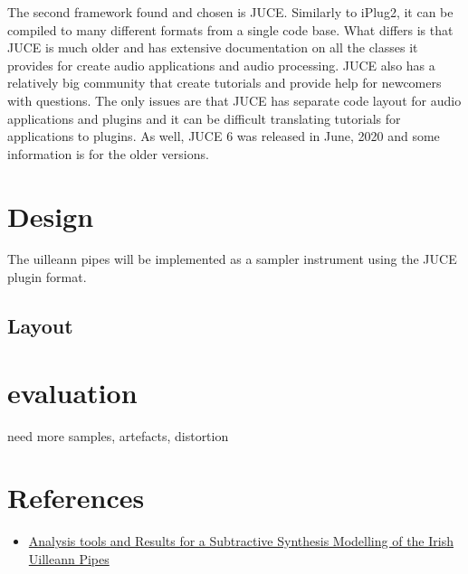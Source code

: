 \documentclass[12pt]{article}
\begin{document}
	The second framework found and chosen is JUCE. Similarly to iPlug2, it can be compiled to many different formats from a 
	single code base. What differs is that JUCE is much older and has extensive documentation on all the classes it provides
	for create audio applications and audio processing. JUCE also has a relatively big community that create tutorials and provide
	help for newcomers with questions. The only issues are that JUCE has separate code layout for audio applications and plugins
	and it can be difficult translating tutorials for applications to plugins. As well, JUCE 6 was released in June, 2020 and 
	some information is for the older versions.
	
		
\section{Design}
	The uilleann pipes will be implemented as a sampler instrument using the JUCE plugin format. 
	
	\subsection{Layout}
	
	\subparagraph{}		
		
		
\section {evaluation}
need more samples, artefacts, distortion
		
	
	
	
	
	
	\section{References}
	\begin{itemize}
		\item \href{http://mural.maynoothuniversity.ie/4106/}
		{Analysis tools and Results for a Subtractive Synthesis Modelling of the Irish Uilleann Pipes }
		
	\end{itemize}	
		
		
\end{document}
